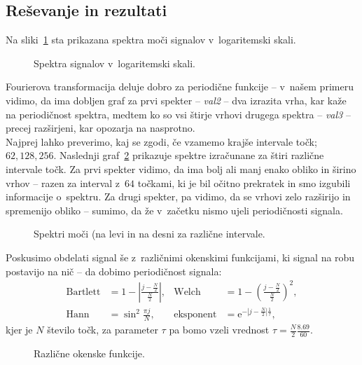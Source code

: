 \documentclass[a4paper,pdftex,10pt]{article}
\numberwithin{figure}{section} %
\begin{document}
\subsection{Reševanje in rezultati}
Na sliki~\ref{slika2} sta prikazana spektra moči signalov v~logaritemski skali.
\begin{figure}[H]
    \centering
    \resizebox{0.8\linewidth}{!}{}
    \caption{Spektra signalov v~logaritemski skali.}
    \label{slika2}
\end{figure}
Fourierova transformacija deluje dobro za periodične funkcije -- v~našem primeru vidimo, da
ima dobljen graf za prvi spekter -- \emph{val2} -- dva izrazita vrha, kar kaže na 
periodičnost spektra, medtem ko so vsi štirje vrhovi drugega spektra -- \emph{val3} -- 
precej razširjeni, kar opozarja na nasprotno. \\
Najprej lahko preverimo, kaj se zgodi, če vzamemo krajše intervale točk; ${62,128,256}$. 
Naslednji graf~\ref{slika3} prikazuje spektre izračunane za štiri različne intervale točk. 
Za prvi spekter vidimo, da ima bolj ali manj enako obliko in širino vrhov -- razen za 
interval z~$64$ točkami, ki je bil očitno prekratek in smo izgubili informacije o~spektru. 
Za drugi spekter, pa vidimo, da se vrhovi zelo razširijo in spremenijo obliko -- sumimo, 
da že v~začetku nismo ujeli periodičnosti signala.\\
\begin{figure}[H]
    \centering
    \resizebox{0.49\linewidth}{!}{}
    \resizebox{0.49\linewidth}{!}{}
    \caption{Spektri moči (na levi \protect{} in na desni \protect{} za 
    različne intervale.}
    \label{slika3}
\end{figure}
Poskusimo obdelati signal še z~različnimi okenskimi funkcijami, ki signal na robu postavijo
na nič -- da dobimo periodičnost signala:
\begin{align}
     \text{Bartlett} &= 1 - \left| \frac{j-\frac{N}{2}}{\frac{N}{2}} \right|,
     & \text{Welch} &= 1- \left( \frac{j-\frac{N}{2}}{\frac{N}{2}} \right)^2,\\
     \text{Hann} &= \sin^2 \frac{\pi j}{N},
     & \text{eksponent} &= \mathrm{e}^{-|j-\frac{N}{2}|\frac{1}{\tau}},
\end{align}
kjer je $N$ število točk, za parameter $\tau$ pa bomo vzeli vrednost 
$\tau =\frac{N}{2}\frac{8.69}{60}.$ \\
\begin{figure}[H]
    \centering
    \resizebox{0.8\linewidth}{!}{}
    \caption{Različne okenske funkcije.}
    \label{slika4}
\end{figure}
\end{document}
